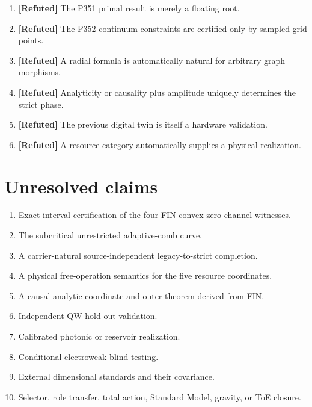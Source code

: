 \documentclass[11pt,a4paper,openany]{report}
\newcommand{\statusRefuted}{\textcolor{finred}{[Refuted]}}
\begin{document}
\begin{enumerate}
\item 
\textbf{\statusRefuted{}} The P351 primal result is merely a floating root.

\item 
\textbf{\statusRefuted{}} The P352 continuum constraints are certified only by sampled grid points.

\item 
\textbf{\statusRefuted{}} A radial formula is automatically natural for arbitrary graph morphisms.

\item 
\textbf{\statusRefuted{}} Analyticity or causality plus amplitude uniquely determines the strict phase.

\item 
\textbf{\statusRefuted{}} The previous digital twin is itself a hardware validation.

\item 
\textbf{\statusRefuted{}} A resource category automatically supplies a physical realization.

\end{enumerate}

\section{Unresolved claims}

\begin{enumerate}
\item 
Exact interval certification of the four FIN convex-zero channel witnesses.

\item 
The subcritical unrestricted adaptive-comb curve.

\item 
A carrier-natural source-independent legacy-to-strict completion.

\item 
A physical free-operation semantics for the five resource coordinates.

\item 
A causal analytic coordinate and outer theorem derived from FIN.

\item 
Independent QW hold-out validation.

\item 
Calibrated photonic or reservoir realization.

\item 
Conditional electroweak blind testing.

\item 
External dimensional standards and their covariance.

\item 
Selector, role transfer, total action, Standard Model, gravity, or ToE closure.

\end{enumerate}
\end{document}
